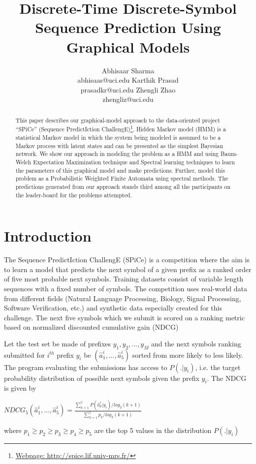 \documentclass[letterpaper]{article}
\title{Discrete-Time Discrete-Symbol Sequence Prediction Using Graphical Models}
\author{Abhisaar Sharma \\ abhisaas@uci.edu \And Karthik Prasad \\ prasadkr@uci.edu \And Zhengli Zhao \\ zhengliz@uci.edu}
\begin{document}
\maketitle

\begin{abstract}
	This paper describes our graphical-model approach to the data-oriented project “SPiCe” (Sequence PredictIction ChallengE)\footnote{\href{http://spice.lif.univ-mrs.fr/}{Webpage: http://spice.lif.univ-mrs.fr/}}. Hidden Markov model (HMM) is a statistical Markov model in which the system being modeled is assumed to be a Markov process with latent states and can be presented as the simplest Bayesian network. We show our approach in modeling the problem as a HMM and using Baum-Welch Expectation Maximization technique and Spectral learning techniques to learn the parameters of this graphical model and make predictions. Further, model this problem as a Probabilistic Weighted Finite Automata using spectral methods. The predictions generated from our approach stands third among all the participants on the leader-board for the problems attempted.
					
\end{abstract}

\section{Introduction}
The Sequence PredictIction ChallengE (SPiCe) is a competition where the aim is to learn a model that predicts the next symbol of a given prefix as a ranked order of five most probable next symbols. Training datasets consist of variable length sequences with a fixed number of symbols. The competition uses real-world data from different fields (Natural Language Processing, Biology, Signal Processing, Software Verification, etc.) and synthetic data especially created for this challenge. The next five symbols which we submit is scored on a ranking metric based on normalized discounted cumulative gain (NDCG)

Let the test set be made of prefixes $y_{1},y_{2},..., y_{M}$ and the next symbols ranking submitted for $i^{th}$ prefix $y_{i}$ be $(\hat{a}^{i}_{1},...,\hat{a}^{i}_{5})$ sorted from more likely to less likely. The program evaluating the submissions has access to $P(.|y_{i})$, i.e. the target probability distribution of possible next symbols given the prefix $y_{i}$. The NDCG is given by
\begin{center}
	$\displaystyle NDCG_{5}(\hat{a}^{i}_{1},...,\hat{a}^{i}_{5}) = \frac{\sum_{k=1}^{5}P(\hat{a}_{k}^{i}| y_{i}) / log_{2}(k+1)}{\sum_{k=1}^{5}p_{k} / log_{2}(k+1)} $  
\end{center} 
where $p_{1} \geq p_{2} \geq  p_{3} \geq p_{4} \geq p_{5}$ are the top 5 values in the distribution $P(.|y_{i})$
\end{document}
